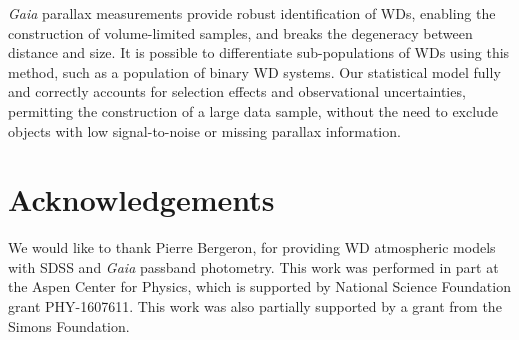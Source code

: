 \documentclass[fleqn,usenatbib]{mnras}
\begin{document}
\emph{Gaia} parallax measurements provide robust identification of WDs, enabling the construction of volume-limited samples, and breaks the degeneracy between distance and size. It is possible to differentiate sub-populations of WDs using this method, such as a population of binary WD systems. Our statistical model fully and correctly accounts for selection effects and observational uncertainties, permitting the construction of a large data sample, without the need to exclude objects with low signal-to-noise or missing parallax information.



\section*{Acknowledgements}

We would like to thank Pierre Bergeron, for providing WD atmospheric models with SDSS and \emph{Gaia} passband photometry. This work was performed in part at the Aspen Center for Physics, which is supported by National Science Foundation grant PHY-1607611. This work was also partially supported by a grant from the Simons Foundation.











\bsp	%
\label{lastpage}
\end{document}

